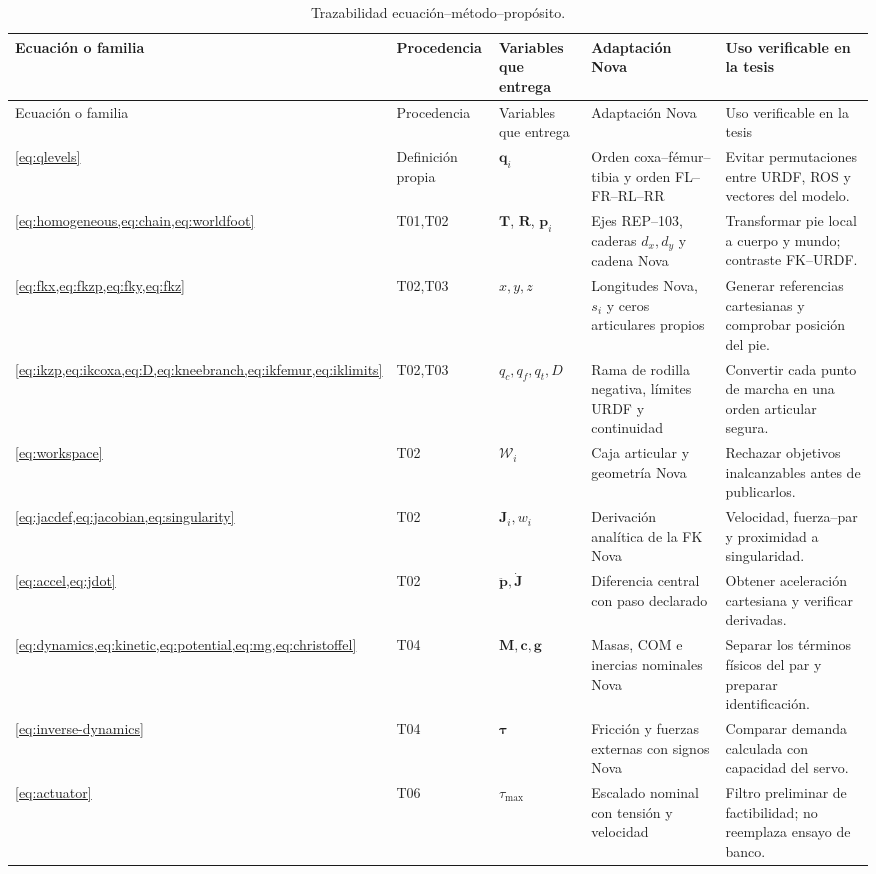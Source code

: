\documentclass[11pt,letterpaper]{article}
\newcommand{\vect}[1]{\bm{#1}}
\newcommand{\mat}[1]{\bm{#1}}
\begin{document}
\scriptsize
\begin{longtable}{p{2.5cm}p{2.1cm}p{3.1cm}p{3.5cm}p{3.3cm}}
\caption{Trazabilidad ecuación--método--propósito.}\label{tab:eqtrace}\\
\toprule Ecuación o familia&Procedencia&Variables que entrega&Adaptación Nova&Uso verificable en la tesis\\
\midrule\endfirsthead
\toprule Ecuación o familia&Procedencia&Variables que entrega&Adaptación Nova&Uso verificable en la tesis\\
\midrule\endhead
\cref{eq:qlevels}&Definición propia&$\vect q_i$&Orden coxa--fémur--tibia y
orden FL--FR--RL--RR&Evitar permutaciones entre URDF, ROS y vectores del modelo.\\
\cref{eq:homogeneous,eq:chain,eq:worldfoot}&T01,T02&$\mat T$, $\mat R$,
$\vect p_i$&Ejes REP--103, caderas $d_x,d_y$ y cadena Nova&Transformar pie
local a cuerpo y mundo; contraste FK--URDF.\\
\cref{eq:fkx,eq:fkzp,eq:fky,eq:fkz}&T02,T03&$x,y,z$&Longitudes Nova,
$s_i$ y ceros articulares propios&Generar referencias cartesianas y comprobar
posición del pie.\\
\cref{eq:ikzp,eq:ikcoxa,eq:D,eq:kneebranch,eq:ikfemur,eq:iklimits}&T02,T03&
$q_c,q_f,q_t,D$&Rama de rodilla negativa, límites URDF y continuidad&Convertir
cada punto de marcha en una orden articular segura.\\
\cref{eq:workspace}&T02&$\mathcal W_i$&Caja articular y geometría Nova&Rechazar
objetivos inalcanzables antes de publicarlos.\\
\cref{eq:jacdef,eq:jacobian,eq:singularity}&T02&$\mat J_i,w_i$&Derivación
analítica de la FK Nova&Velocidad, fuerza--par y proximidad a singularidad.\\
\cref{eq:accel,eq:jdot}&T02&$\ddot{\vect p},\dot{\mat J}$&Diferencia central
con paso declarado&Obtener aceleración cartesiana y verificar derivadas.\\
\cref{eq:dynamics,eq:kinetic,eq:potential,eq:mg,eq:christoffel}&T04&
$\mat M,\vect c,\vect g$&Masas, COM e inercias nominales Nova&Separar los
términos físicos del par y preparar identificación.\\
\cref{eq:inverse-dynamics}&T04&$\vect\tau$&Fricción y fuerzas externas con
signos Nova&Comparar demanda calculada con capacidad del servo.\\
\cref{eq:actuator}&T06&$\tau_{\max}$&Escalado nominal con tensión y velocidad&
Filtro preliminar de factibilidad; no reemplaza ensayo de banco.\\

\end{longtable}
\end{document}
